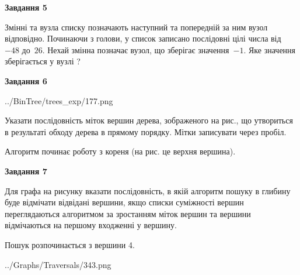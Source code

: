 \documentclass[12pt, ukrainian]{article}
\begin{document}
{\begin {large}
{\begin {center}\textbf{Завдання 5}\end {center}}\par
Змінні  та  вузла списку позначають наступний та попередній за ним вузол відповідно. Починаючи з голови, у список записано послідовні цілі числа від~$-48$ до~$26$. Нехай змінна  позначає вузол, що зберігає значення~$-1$.
Яке значення зберігається у вузлі  ?\par
\newpage

{\begin {center}\textbf{Завдання 6}\end {center}}\par

\begin{center}
	{../BinTree/trees_exp/177.png}
\end{center}
Указати послідовність міток вершин дерева, зображеного на рис., що утвориться в результаті обходу дерева в прямому порядку. Мітки записувати через пробіл.\par Алгоритм починає роботу з кореня (на рис. це верхня вершина).\par
\newpage

{\begin {center}\textbf{Завдання 7}\end {center}}\par
Для графа на рисунку вказати послідовність, в якій алгоритм пошуку в глибину буде відмічати відвідані вершини, якщо списки суміжності вершин переглядаються алгоритмом за зростанням міток вершин та вершини відмічаються на першому вход\-женні у вершину.\par
Пошук розпочинається з вершини 4.\par

\begin{center}
	{../Graphs/Traversals/343.png}
\end{center}\par
\newpage


\end{large}}
\end{document}
